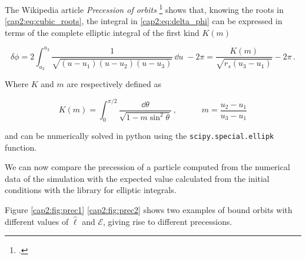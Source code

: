 The Wikipedia article \textit{Precession of orbits} \footcite{enwiki:1242536958}
shows that, knowing the roots in \ref{cap2:eq:cubic_roots}, the integral in
\ref{cap2:eq:delta_phi} can be expressed in terms of the complete elliptic
integral of the first kind $K(m)$

\begin{equation}
    \delta \phi = 2 \int_{u_2}^{u_3} \frac{1}{\sqrt{(u - u_1)(u - u_2)(u - u_3)}}
    \, \dd{u} \; - 2 \pi
    = \frac{K(m)}{\sqrt{r_s (u_3 - u_1)}} - 2 \pi \, .
    \label{cap2:eq:delta_phi_elliptic}
\end{equation}

Where $K$ and $m$ are respectively defined as

\begin{equation}
    K(m) = \int_0^{\pi/2} \frac{\dd{\theta}}{\sqrt{1 - m \sin^2 \theta}} \, ,
    \quad \quad \quad
    m = \frac{u_2 - u_1}{u_3 - u_1}
\end{equation}

and can be numerically solved in python using the \texttt{scipy.special.ellipk}
function.

We can now compare the precession of a particle computed from the numerical data
of the simulation with the expected value calculated from the initial conditions
with the library for elliptic integrals.

Figure \ref{cap2:fig:prec1} \ref{cap2:fig:prec2} shows two examples of bound
orbits with different values of $\hat \ell$ and $\mathcal E$, giving rise to
different precessions.

